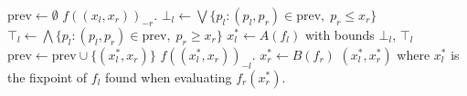 \begin{algorithm}[h]
  \caption{\citep{fasterTarski}}\label{fixDecompAlg}
  \begin{algorithmic}[1]
    \State $\mathrm{prev} \gets \emptyset$
        \Return $f((x_l, x_r))_{-r}$.
      \EndProcedure
      \State $\bot_l \gets \bigvee\{p_l : (p_l, p_r) \in \mathrm{prev}, \; p_r \leq x_r \}$
      \State $\top_l \gets \bigwedge\{p_l : (p_l, p_r) \in \mathrm{prev}, \; p_r \geq x_r \}$
      \State $x_l^* \gets A(f_l)$ with bounds $\bot_l$, $\top_l$
      \State $\mathrm{prev} \gets \mathrm{prev} \cup \{(x_l^*, x_r)\}$
      \State \Return $f((x_l^*, x_r))_{-l}$.
    \EndProcedure
    \State $x_r^* \gets B(f_r)$
    \State \Return $(x_l^*, x_r^*)$ where $x_l^*$ is the fixpoint of $f_l$ 
    found when evaluating $f_r(x_r^*)$.
  \EndProcedure
  \end{algorithmic}
\end{algorithm}

